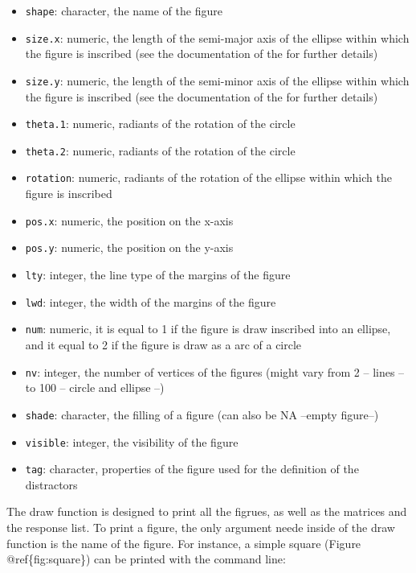 \begin{itemize}
\tightlist
\item
  \texttt{shape}: character, the name of the figure
\item
  \texttt{size.x}: numeric, the length of the semi-major axis of the ellipse within which the figure is inscribed (see the documentation of the  for further details)
\item
  \texttt{size.y}: numeric, the length of the semi-minor axis of the ellipse within which the figure is inscribed (see the documentation of the  for further details)
\item
  \texttt{theta.1}: numeric, radiants of the rotation of the circle
\item
  \texttt{theta.2}: numeric, radiants of the rotation of the circle
\item
  \texttt{rotation}: numeric, radiants of the rotation of the ellipse within which the figure is inscribed
\item
  \texttt{pos.x}: numeric, the position on the x-axis
\item
  \texttt{pos.y}: numeric, the position on the y-axis
\item
  \texttt{lty}: integer, the line type of the margins of the figure
\item
  \texttt{lwd}: integer, the width of the margins of the figure
\item
  \texttt{num}: numeric, it is equal to 1 if the figure is draw inscribed into an ellipse, and it equal to 2 if the figure is draw as a arc of a circle
\item
  \texttt{nv}: integer, the number of vertices of the figures (might vary from 2 -- lines -- to 100 -- circle and ellipse --)
\item
  \texttt{shade}: character, the filling of a figure (can also be NA --empty figure--)
\item
  \texttt{visible}: integer, the visibility of the figure
\item
  \texttt{tag}: character, properties of the figure used for the definition of the distractors
\end{itemize}

The draw function is designed to print all the figrues, as well as the matrices and the response list.
To print a figure, the only argument neede inside of the draw function is the name of the figure.
For instance, a simple square (Figure @ref\{fig:square\}) can be printed with the command line:

